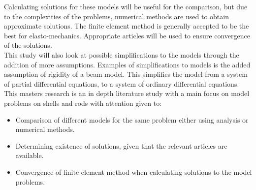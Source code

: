 \documentclass[../../main.tex]{subfiles}
\begin{document}
Calculating solutions for these models will be useful for the comparison, but due to the complexities of the problems, numerical methods are used to obtain approximate solutions. The finite element method is generally accepted to be the best for elasto-mechanics. Appropriate articles will be used to ensure convergence of the solutions.\\

This study will also look at possible simplifications to the models through the addition of more assumptions. Examples of simplifications to models is the added assumption of rigidity of a beam model. This simplifies the model from a system of partial differential equations, to a system of ordinary differential equations.\\

This masters research is an in depth literature study with a main focus on model problems on shells and rods with attention given to:
\begin{itemize}
 \item Comparison of different models for the same problem either using analysis or numerical methods.
 \item Determining existence of solutions, given that the relevant articles are available.
 \item Convergence of finite element method when calculating solutions to the model problems.
\end{itemize}
\end{document}
